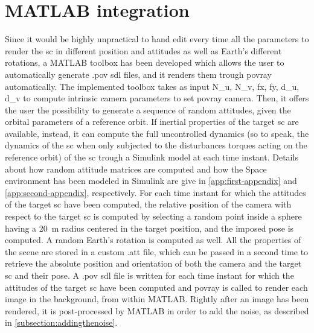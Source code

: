 \section{MATLAB integration}
Since it would be highly unpractical to hand edit every time all the parameters to render the \acrshort{sc} in different position and attitudes as well as Earth's different rotations, a MATLAB toolbox has been developed which allows the user to automatically generate .pov \acrshort{sdl} files, and it renders them trough \acrshort{povray} automatically.
The implemented toolbox takes as input \gls{N_u}, \gls{N_v}, \gls{fx}, \gls{fy}, \gls{d_u}, \gls{d_v} to compute intrinsic camera parameters to set \acrshort{povray} camera.
Then, it offers the user the possibility to generate a sequence of random attitudes, given the orbital parameters of a reference orbit. If inertial properties of the target \acrshort{sc} are available, instead, it can compute the full uncontrolled dynamics (so to speak, the dynamics of the \acrshort{sc} when only subjected to the disturbances torques acting on the reference orbit) of the \acrshort{sc} trough a Simulink model at each time instant. Details about how random attitude matrices are computed and how the Space environment has been modeled in Simulink are give in \ref{app:first-appendix} and \ref{app:second-appendix}, respectively.
For each time instant for which the attitudes of the target \acrshort{sc} have been computed, the relative position of the camera with respect to the target \acrshort{sc} is computed by selecting a random point inside a sphere having a \SI{20}{\m} radius centered in the target position, and the imposed pose is computed. A random Earth's rotation is computed as well.
All the properties of the scene are stored in a custom .att file, which can be passed in a second time to retrieve the absolute position and orientation of both the camera and the target \acrshort{sc} and their pose.
A .pov \acrshort{sdl} file is written for each time instant for which the attitudes of the target \acrshort{sc} have been computed and \acrshort{povray} is called to render each image in the background, from within MATLAB. Rightly after an image has been rendered, it is post-processed by MATLAB in order to add the noise, as described in \ref{subsection:addingthenoise}.

